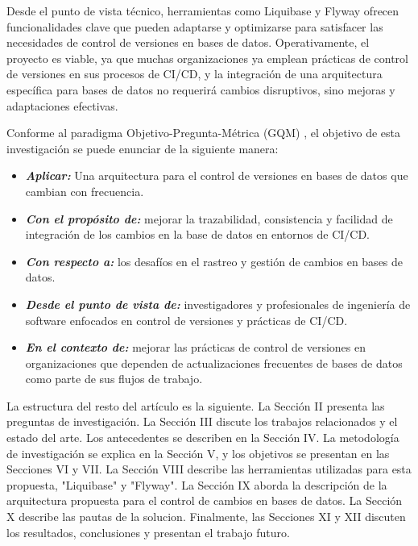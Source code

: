 \documentclass{IEEEtran}
\begin{document}
Desde el punto de vista técnico, herramientas como Liquibase y Flyway ofrecen funcionalidades clave que pueden adaptarse y optimizarse para satisfacer las necesidades de control de versiones en bases de datos.
Operativamente, el proyecto es viable, ya que muchas organizaciones ya emplean prácticas de control de versiones en sus procesos de CI/CD, y la integración de una arquitectura específica para bases de datos no requerirá cambios disruptivos, sino mejoras y adaptaciones efectivas.

Conforme al paradigma Objetivo-Pregunta-Métrica (GQM) \cite{Basili1992}, el objetivo de esta investigación se puede enunciar de la siguiente manera:

\begin{itemize}
    \item[] {\textbf{\textit{Aplicar:}}} Una arquitectura para el control de versiones en bases de datos que cambian con frecuencia.
    \item[] {\textbf{\textit{Con el propósito de:}}} mejorar la trazabilidad, consistencia y facilidad de integración de los cambios en la base de datos en entornos de CI/CD.
    \item[] {\textbf{\textit{Con respecto a:}}} los desafíos en el rastreo y gestión de cambios en bases de datos.
    \item[] {\textbf{\textit{Desde el punto de vista de:}}} investigadores y profesionales de ingeniería de software enfocados en control de versiones y prácticas de CI/CD.
    \item[] {\textbf{\textit{En el contexto de:}}} mejorar las prácticas de control de versiones en organizaciones que dependen de actualizaciones frecuentes de bases de datos como parte de sus flujos de trabajo.
\end{itemize}


\vspace{0.5cm}
La estructura del resto del artículo es la siguiente. La Sección II presenta las preguntas de investigación. La Sección III discute los trabajos relacionados y el estado del arte. Los antecedentes se describen en la Sección IV. La metodología de investigación se explica en la Sección V, y los objetivos se presentan en las Secciones VI y VII. La Sección VIII describe las herramientas utilizadas para esta propuesta, "Liquibase" y "Flyway". La Sección IX aborda la descripción de la arquitectura propuesta para el control de cambios en bases de datos. La Sección X describe las pautas de la solucion. Finalmente, las Secciones XI y XII discuten los resultados, conclusiones y presentan el trabajo futuro.
\end{document}
